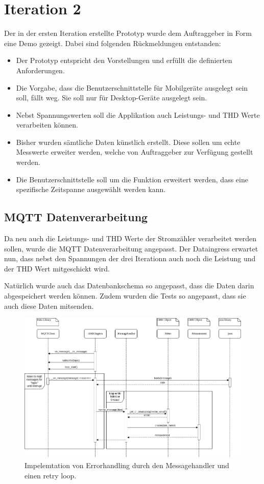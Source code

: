 \section{Iteration 2}
Der in der ersten Iteration erstellte Prototyp wurde dem Auftraggeber in Form eine Demo gezeigt.
Dabei sind folgenden Rückmeldungen entstanden:
\begin{itemize}
    \item Der Prototyp entspricht den Vorstellungen und erfüllt die definierten Anforderungen.
    \item Die Vorgabe, dass die Benutzerschnittstelle für Mobilgeräte ausgelegt sein soll, fällt weg.
          Sie soll nur für Desktop-Geräte ausgelegt sein.
    \item Nebst Spannungswerten soll die Applikation auch Leistungs- und THD Werte verarbeiten können.
    \item Bisher wurden sämtliche Daten künstlich erstellt.
    Diese sollen um echte Messwerte erweiter werden, welche von Auftraggeber zur Verfügung gestellt werden.
    \item Die Benutzerschnittstelle soll um die Funktion erweitert werden,
    dass eine spezifische Zeitspanne ausgewählt werden kann.



\end{itemize}

\subsection{\ac{MQTT} Datenverarbeitung}

Da neu auch die Leistungs- und THD Werte der Stromzähler verarbeitet werden sollen, wurde
die \ac{MQTT} Datenverarbeitung angepasst. Der Dataingress erwartet nun, dass nebst
den Spannungen der drei Iterationn auch noch die Leistung und der THD Wert mitgeschickt wird.

Natürlich wurde auch das Datenbankschema so angepasst, dass die Daten darin abgespeichert
werden können. Zudem wurden die Tests so angepasst, dass sie auch diese Daten
mitsenden.

\begin{figure}[h]
    \centering
    \includegraphics[width=1.0\textwidth]{gfx/dataingress-sequence}
    \caption{
        Impelemtation von Errorhandling durch den Messagehandler und einen
        retry loop.
    }
    \label{fig:dataingress-sequence}
\end{figure}

